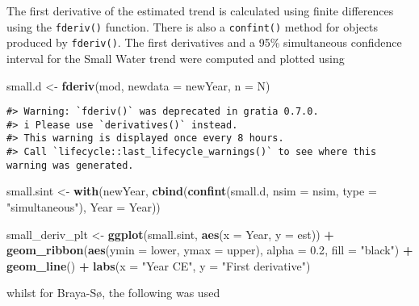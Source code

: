 \documentclass[12pt,]{article}
\newenvironment{Shaded}{\begin{snugshade}}{\end{snugshade}}
\newcommand{\DataTypeTok}[1]{\textcolor[rgb]{0.13,0.29,0.53}{#1}}
\newcommand{\FloatTok}[1]{\textcolor[rgb]{0.00,0.00,0.81}{#1}}
\newcommand{\KeywordTok}[1]{\textcolor[rgb]{0.13,0.29,0.53}{\textbf{#1}}}
\newcommand{\NormalTok}[1]{#1}
\newcommand{\OperatorTok}[1]{\textcolor[rgb]{0.81,0.36,0.00}{\textbf{#1}}}
\newcommand{\StringTok}[1]{\textcolor[rgb]{0.31,0.60,0.02}{#1}}
\begin{document}
The first derivative of the estimated trend is calculated using finite
differences using the \texttt{fderiv()} function. There is also a
\texttt{confint()} method for objects produced by \texttt{fderiv()}. The
first derivatives and a 95\% simultaneous confidence interval for the
Small Water trend were computed and plotted using

\begin{Shaded}
\begin{Highlighting}[]
\NormalTok{small.d <-}\StringTok{ }\KeywordTok{fderiv}\NormalTok{(mod, }\DataTypeTok{newdata =}\NormalTok{ newYear, }\DataTypeTok{n =}\NormalTok{ N)}
\end{Highlighting}
\end{Shaded}

\begin{verbatim}
#> Warning: `fderiv()` was deprecated in gratia 0.7.0.
#> i Please use `derivatives()` instead.
#> This warning is displayed once every 8 hours.
#> Call `lifecycle::last_lifecycle_warnings()` to see where this warning was generated.
\end{verbatim}

\begin{Shaded}
\begin{Highlighting}[]
\NormalTok{small.sint <-}\StringTok{ }\KeywordTok{with}\NormalTok{(newYear,}
                   \KeywordTok{cbind}\NormalTok{(}\KeywordTok{confint}\NormalTok{(small.d, }\DataTypeTok{nsim =}\NormalTok{ nsim,}
                                 \DataTypeTok{type =} \StringTok{"simultaneous"}\NormalTok{),}
                         \DataTypeTok{Year =}\NormalTok{ Year))}

\NormalTok{small_deriv_plt <-}\StringTok{ }\KeywordTok{ggplot}\NormalTok{(small.sint, }\KeywordTok{aes}\NormalTok{(}\DataTypeTok{x =}\NormalTok{ Year, }\DataTypeTok{y =}\NormalTok{ est)) }\OperatorTok{+}
\StringTok{    }\KeywordTok{geom_ribbon}\NormalTok{(}\KeywordTok{aes}\NormalTok{(}\DataTypeTok{ymin =}\NormalTok{ lower, }\DataTypeTok{ymax =}\NormalTok{ upper), }\DataTypeTok{alpha =} \FloatTok{0.2}\NormalTok{,}
                \DataTypeTok{fill =} \StringTok{"black"}\NormalTok{) }\OperatorTok{+}
\StringTok{    }\KeywordTok{geom_line}\NormalTok{() }\OperatorTok{+}
\StringTok{    }\KeywordTok{labs}\NormalTok{(}\DataTypeTok{x =} \StringTok{"Year CE"}\NormalTok{, }\DataTypeTok{y =} \StringTok{"First derivative"}\NormalTok{)}
\end{Highlighting}
\end{Shaded}

whilst for Braya-Sø, the following was used
\end{document}
